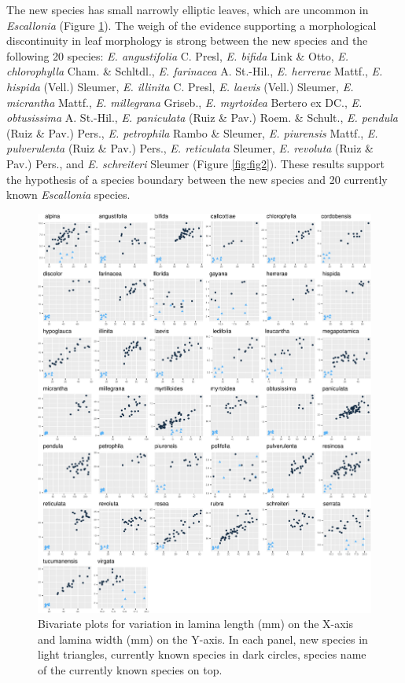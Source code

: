 \documentclass[fleqn,10pt,lineno]{wlpeerj} %
\begin{document}
The new species has small narrowly elliptic leaves, which are uncommon in \emph{Escallonia} (Figure \ref{fig:fig1}). The weigh of the evidence supporting a morphological discontinuity in leaf morphology is strong between the new species and the following 20 species: \emph{E. angustifolia} C. Presl, \emph{E. bifida} Link \& Otto, \emph{E. chlorophylla} Cham. \& Schltdl., \emph{E. farinacea} A. St.-Hil., \emph{E. herrerae} Mattf., \emph{E. hispida} (Vell.) Sleumer, \emph{E. illinita} C. Presl, \emph{E. laevis} (Vell.) Sleumer, \emph{E. micrantha} Mattf., \emph{E. millegrana} Griseb., \emph{E. myrtoidea} Bertero ex DC., \emph{E. obtusissima} A. St.-Hil., \emph{E. paniculata} (Ruiz \& Pav.) Roem. \& Schult., \emph{E. pendula} (Ruiz \& Pav.) Pers., \emph{E. petrophila} Rambo \& Sleumer, \emph{E. piurensis} Mattf., \emph{E. pulverulenta} (Ruiz \& Pav.) Pers., \emph{E. reticulata} Sleumer, \emph{E. revoluta} (Ruiz \& Pav.) Pers., and \emph{E. schreiteri} Sleumer (Figure \ref{fig:fig2}). These results support the hypothesis of a species boundary between the new species and 20 currently known \emph{Escallonia} species.

\begin{figure}[ht]
\centering
\includegraphics[width=\linewidth]{fig1}
\caption{Bivariate plots for variation in lamina length (mm) on the X-axis and lamina width (mm) on the Y-axis. In each panel, new species in light triangles, currently known species in dark circles, species name of the currently known species on top.}
\label{fig:fig1}
\end{figure}
\end{document}
